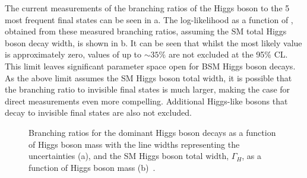 The current measurements of the branching ratios of the Higgs boson to the 5 most frequent final states can be seen in a. The log-likelihood as a function of \BRinv, obtained from these measured branching ratios, assuming the \ac{SM} total Higgs boson decay width, is shown in b. It can be seen that whilst the most likely value is approximately zero, values of \BRinv up to $\sim35\%$ are not excluded at the 95\% \ac{CL}. This limit leaves significant parameter space open for \ac{BSM} Higgs boson decays. As the above limit assumes the \ac{SM} Higgs boson total width, it is possible that the branching ratio to invisible final states is much larger, making the case for direct measurements even more compelling. Additional Higgs-like bosons that decay to invisible final states are also not excluded.


\begin{figure}
  \caption{Branching ratios for the dominant Higgs boson decays as a function of Higgs boson mass with the line widths representing the uncertainties (a), and the \ac{SM} Higgs boson total width, $\Gamma_{H}$, as a function of Higgs boson mass (b)~\cite{Heinemeyer:1559921}.}
  \label{fig:smdecay}
\end{figure}

